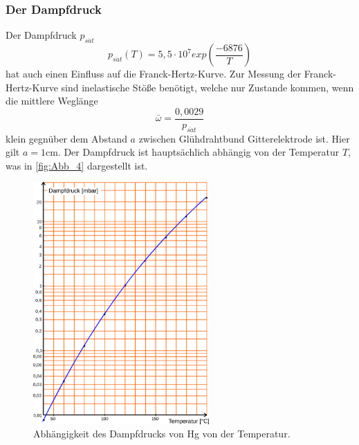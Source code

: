 \subsubsection{Der Dampfdruck}
\label{subsubsec:Dampfdruck}
Der Dampfdruck $p_{s\ddot{a}t}$
\begin{equation}
    p_{s\ddot{a}t}(T) = 5,5 \cdot 10^7 exp(\frac{-6876}{T})
    \label{eqn:psät}
\end{equation}
hat auch einen Einfluss auf die Franck-Hertz-Kurve. Zur Messung der Franck-Hertz-Kurve sind inelastische Stöße benötigt,
welche nur Zustande kommen, wenn die mittlere Weglänge
\begin{equation}
    \bar{\omega} = \frac{0,0029}{p_{s\ddot{a}t}}
    \label{eqn:Weglänge}
\end{equation}
klein gegnüber dem Abstand $a$ zwischen Glühdrahtbund Gitterelektrode ist. Hier gilt $a = 1 \si{\centi\meter}$.
Der Dampfdruck ist hauptsächlich abhängig von der Temperatur $T$, was in \autoref{fig:Abb_4} dargestellt ist.
\begin{figure}[H]
    \centering
    \includegraphics[width=0.6\textwidth]{build/Abb_4.png}
    \caption{Abhängigkeit des Dampfdrucks von Hg von der Temperatur\cite{V601}.}
    \label{fig:Abb_4}
\end{figure}
